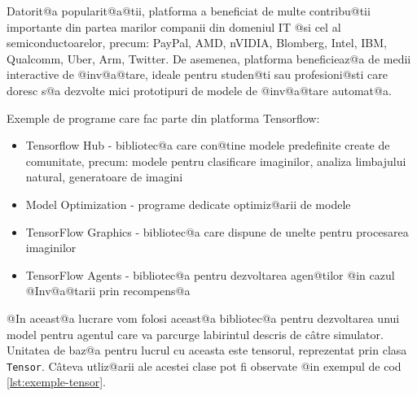 Datorit@a popularit@a@tii, platforma a beneficiat de multe contribu@tii importante din partea marilor companii din domeniul IT @si cel al semiconductoarelor, precum: PayPal, AMD, nVIDIA, Blomberg, Intel, IBM, Qualcomm, Uber, Arm, Twitter. De asemenea, platforma beneficieaz@a de medii interactive de @inv@a@tare, ideale pentru studen@ti sau profesioni@sti care doresc s@a dezvolte mici prototipuri de modele de @inv@a@tare automat@a.

Exemple de programe care fac parte din platforma Tensorflow:
\begin{itemize}
	\item Tensorflow Hub - bibliotec@a care con@tine modele predefinite create de comunitate, precum: modele pentru clasificare imaginilor, analiza limbajului natural, generatoare de imagini
	\item Model Optimization - programe dedicate optimiz@arii de modele
	\item TensorFlow Graphics - bibliotec@a care dispune de unelte pentru procesarea imaginilor
	\item TensorFlow Agents - bibliotec@a pentru dezvoltarea agen@tilor @in cazul @Inv@a@tarii prin recompens@a
\end{itemize}

@In aceast@a lucrare vom folosi aceast@a bibliotec@a pentru dezvoltarea unui model pentru agentul care va parcurge labirintul descris de c\^ atre simulator. Unitatea de baz@a pentru lucrul cu aceasta este tensorul, reprezentat prin clasa \texttt{Tensor}. C\^ ateva utliz@arii ale acestei clase pot fi observate @in exempul de cod \ref{lst:exemple-tensor}.

